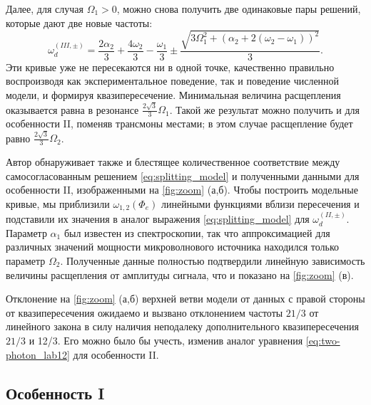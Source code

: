 \documentclass[14pt, a4paper]{extreport}
\numberwithin{equation}{section}
\begin{document}
Далее, для случая $\Omega_1 > 0$, можно снова получить две одинаковые пары решений, которые дают две новые частоты:
\begin{equation}
\omega_d^{(III, \pm)} = \frac{2 \alpha_2}{3} + \frac{4 \omega_{2}}{3} - \frac{\omega_{1}}{3} \pm \frac{\sqrt{3 \Omega_{1}^{2} + \left( \alpha_2 + 2 (\omega_{2} - \omega_{1})\right)^{2}}}{3}.
\label{eq:splitting_model}
\end{equation}
Эти кривые уже не пересекаются ни в одной точке, качественно правильно воспроизводя как экспериментальное поведение, так и поведение численной модели, и формируя квазипересечение. Минимальная величина расщепления оказывается равна в резонансе $ \frac{2\sqrt{3}}{3} \Omega_1$. Такой же результат можно получить и для особенности II, поменяв трансмоны местами; в этом случае расщепление будет равно $ \frac{2\sqrt{3}}{3} \Omega_2$.

Автор обнаруживает также и блестящее количественное соответствие между самосогласованным решением \eqref{eq:splitting_model} и полученными данными для особенности II, изображенными на \autoref{fig:zoom} (а,б). Чтобы построить модельные кривые, мы приблизили $\omega_{1,2}(\Phi_e)$ линейными функциями вблизи пересечения и подставили их значения в аналог выражения \eqref{eq:splitting_model} для $\omega_d^{(II, \pm)}$. Параметр $\alpha_1$ был известен из спектроскопии, так что аппроксимацией для различных значений мощности микроволнового источника находился только параметр $\Omega_2$. Полученные данные полностью подтвердили линейную зависимость величины расщепления от амплитуды сигнала, что и показано на \autoref{fig:zoom} (в).

Отклонение на \autoref{fig:zoom} (а,б) верхней ветви модели от данных с правой стороны от квазипересечения ожидаемо и вызвано отклонением частоты $21/3$ от линейного закона в силу наличия неподалеку дополнительного квазипересечения $21/3$ и 12/3. Его можно было бы учесть, изменив аналог уравнения \eqref{eq:two-photon_lab12} для особенности II.

\subsection{Особенность I}
\end{document}
